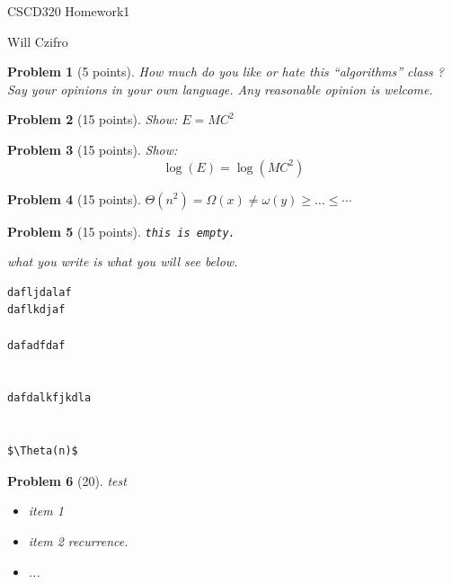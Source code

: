 \documentclass[11pt]{article}
\newtheorem{problem}{Problem}
\begin{document}
\begin{center}
  {\LARGE CSCD320 Homework1}

\bigskip 

{\Large Will Czifro}

\end{center}

\bigskip 

\begin{problem}[5 points]
\label{prob:1}
 How much do you like or hate this 
``algorithms'' class ?  Say your opinions in
  your own language. Any reasonable opinion is welcome.
\end{problem}




\begin{problem}[15 points]
\label{prob:2}
  Show: $E=MC^2$
\end{problem}




\begin{problem}[15 points]
\label{prob:3}
Show: 
$$
\log(E) = \log (MC^2)
$$
\end{problem}




\begin{problem}[15 points]
\label{prob:4}
$\Theta(n^2) = \Omega(x) \neq \omega(y) \geq \ldots \leq \cdots  $
\end{problem}





\begin{problem}[15 points]
\label{prob:5}
{\tt this is empty.}

what you write is what you will see below. 

\begin{verbatim}
dafljdalaf
daflkdjaf

dafadfdaf


dafdalkfjkdla


$\Theta(n)$
\end{verbatim}
\end{problem}



\begin{problem}[20]
\label{prob:6}
test
\begin{itemize}
\item 
item 1

\item 
item 2 recurrence. 
\item ...
\end{itemize}
 
\end{problem}
\end{document}
